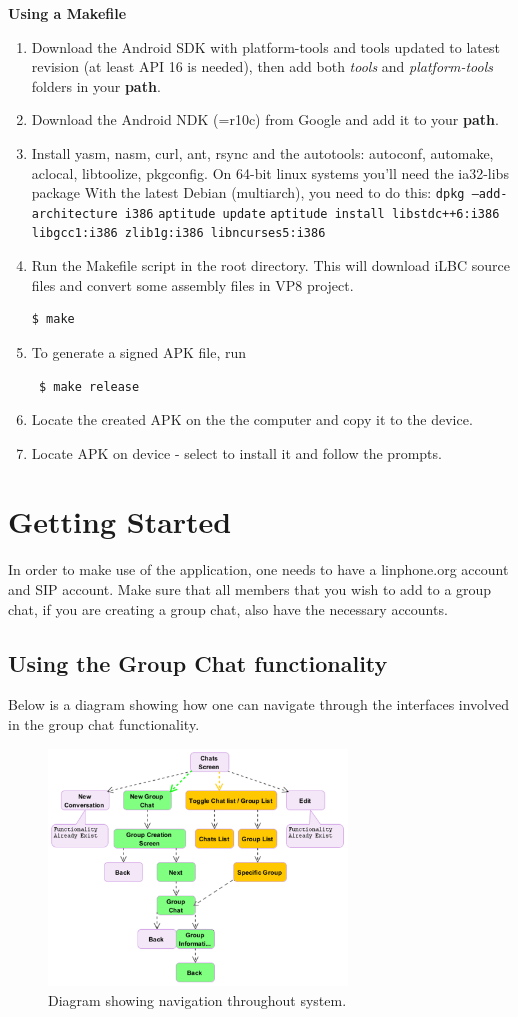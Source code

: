\documentclass[11pt]{article}
\begin{document}
\textbf{Using a Makefile}
\begin{enumerate}
\item Download the Android SDK with platform-tools and tools updated to latest revision (at least API 16 is needed), then add both \textit{tools} and \textit{platform-tools} folders in your \textbf{path}.
\item Download the Android NDK (=r10c) from Google and add it to your \textbf{path}.
\item Install yasm, nasm, curl, ant, rsync and the autotools: autoconf, automake, aclocal, libtoolize, pkgconfig.
\subitem On 64-bit linux systems you'll need the ia32-libs package
\subitem With the latest Debian (multiarch), you need to do this:
\subsubitem \texttt{dpkg --add-architecture i386}
\subsubitem \texttt{aptitude update}
\subsubitem \texttt{aptitude install libstdc++6:i386 libgcc1:i386 zlib1g:i386 libncurses5:i386}
\item Run the Makefile script in the root directory. This will download iLBC source files and convert some assembly files in VP8 project.
\begin{verbatim}$ make \end{verbatim}
\item To generate a signed APK file, run  \begin{verbatim} $ make release \end{verbatim}
\item Locate the created APK on the the computer and copy it to the device. 
\item Locate APK on device - select to install it and follow the prompts.
\end{enumerate}

\section{Getting Started}
In order to make use of the application, one needs to have a linphone.org account and SIP account. Make sure that all members that you wish to add to a group chat, if you are creating a group chat, also have the necessary accounts.
\subsection{Using the Group Chat functionality}
Below is a diagram showing how one can navigate through the interfaces involved in the group chat functionality.
\begin{figure}[H]
\includegraphics[width=300px]{./images/flow.png}
 \caption{Diagram showing navigation throughout system.}
 \label{flow}
 \end{figure}
\end{document}
